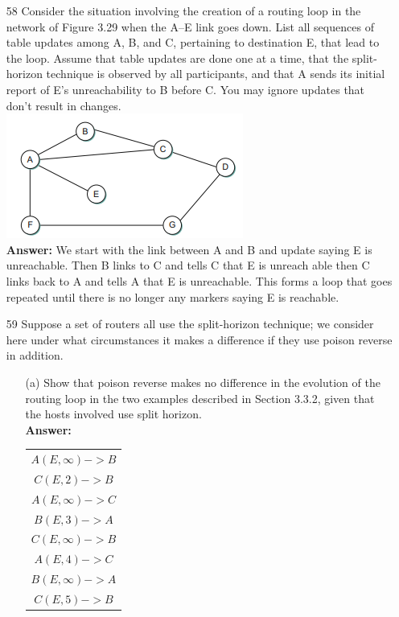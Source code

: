 \documentclass[a4paper]{article}
\begin{document}
\begin{itemize}
	\item[58] Consider the situation involving the creation of a routing loop in the network of Figure 3.29 when the A–E link goes down. List all sequences of table updates among A, B, and C, pertaining to destination E, that lead to the loop. Assume that table updates are done one at a time, that the split-horizon technique is observed by all participants, and that A sends its initial report of E’s unreachability to B before C. You may ignore updates that don’t result in changes. \\
	      \includegraphics{3-29.png} \\
	      \textbf{Answer:} We start with the link between A and B and update saying E is unreachable. Then B links to C and tells C that E is unreach able then C links back to A and tells A that E is unreachable. This forms a loop that goes repeated until there is no longer any markers saying E is reachable.
	\item[59] Suppose a set of routers all use the split-horizon technique; we consider here under what circumstances it makes a difference if they use poison reverse in addition.
	      \begin{itemize}
	      	\item[(a)] Show that poison reverse makes no difference in the evolution of the routing loop in the two examples described in Section 3.3.2, given that the hosts involved use split horizon. \\
	      	      \textbf{Answer:} 
	      	      \begin{tabular}{c}
	      	      	$A(E, \infty)->B$ \\
	      	      	$C(E, 2)->B$      \\
	      	      	$A(E, \infty)->C$ \\
	      	      	$B(E, 3)->A$      \\
	      	      	$C(E, \infty)->B$ \\
	      	      	$A(E, 4)->C$      \\
	      	      	$B(E, \infty)->A$ \\
	      	      	$C(E, 5)->B$      \\

\end{tabular}
\end{itemize}
\end{itemize}
\end{document}
